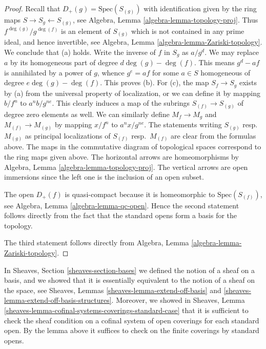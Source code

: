 \begin{proof}
Recall that $D_{+}(g) = \text{Spec}(S_{(g)})$ with identification
given by the ring maps $S \to S_g \leftarrow S_{(g)}$, see
Algebra, Lemma \ref{algebra-lemma-topology-proj}.
Thus $f^{\deg(g)}/g^{\deg(f)}$ is an element of $S_{(g)}$ which is not
contained in any prime ideal, and hence invertible,
see Algebra, Lemma \ref{algebra-lemma-Zariski-topology}.
We conclude that (a) holds.
Write the inverse of $f$ in $S_g$ as $a/g^d$.
We may replace $a$ by its homogeneous part of degree $d\deg(g) - \deg(f)$.
This means $g^d - af$ is annihilated by a power of $g$, whence
$g^e = af$ for some $a \in S$ homogeneous of degree $e\deg(g) - \deg(f)$.
This proves (b).
For (c), the map $S_f \to S_g$ exists by (a) from the universal property
of localization, or we can define it by mapping $b/f^n$
to $a^nb/g^{ne}$. This clearly induces a map of the subrings
$S_{(f)} \to S_{(g)}$ of degree zero elements as well.
We can similarly define $M_f \to M_g$ and $M_{(f)} \to M_{(g)}$ by mapping
$x/f^n$ to $a^nx/g^{ne}$. The statements writing $S_{(g)}$ resp.\ 
$M_{(g)}$ as principal localizations of $S_{(f)}$ resp.\ $M_{(f)}$
are clear from the formulas above. The maps in the commutative diagram
of topological spaces correspond to the ring maps given above. The
horizontal arrows are homeomorphisms by
Algebra, Lemma \ref{algebra-lemma-topology-proj}.
The vertical arrows are open immersions since the left
one is the inclusion of an open subset.

\medskip\noindent
The open $D_{+}(f)$ is quasi-compact because it is homeomorphic
to $\text{Spec}(S_{(f)})$, see  Algebra, Lemma \ref{algebra-lemma-qc-open}.
Hence the second statement follows directly
from the fact that the standard opens form
a basis for the topology.

\medskip\noindent
The third statement follows directly from
Algebra, Lemma \ref{algebra-lemma-Zariski-topology}.
\end{proof}

\noindent
In Sheaves, Section \ref{sheaves-section-bases} we defined
the notion of a sheaf on a basis, and we showed that it is
essentially equivalent to the notion of a sheaf on the space,
see Sheaves, Lemmas \ref{sheaves-lemma-extend-off-basis} and
\ref{sheaves-lemma-extend-off-basis-structures}. Moreover,
we showed in
Sheaves, Lemma \ref{sheaves-lemma-cofinal-systems-coverings-standard-case}
that it is sufficient to check the sheaf
condition on a cofinal system of open coverings for each
standard open. By the lemma above it suffices to check
on the finite coverings by standard opens.

